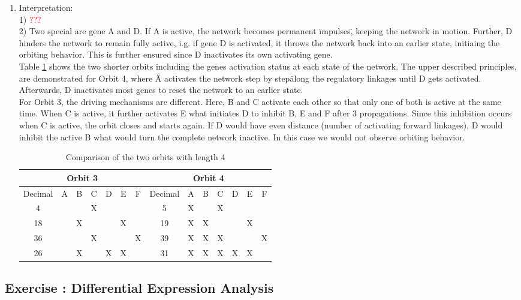 \documentclass[10pt,a4paper]{article}
\newcommand{\exercise}[1]
{
  \stepcounter{subsection}
  \subsection*{Exercise \thesubsection: #1}

}
\begin{document}
\begin{enumerate}
\item Interpretation:\\
1) \textcolor{red}{???}\\
2) Two special are gene A and D. If A is active, the network becomes permanent \"impulses\", keeping the network in motion. Further, D hinders the network to remain fully active, i.g. if gene D is activated, it throws the network back into an earlier state, initiaing the orbiting behavior. This is further ensured since D inactivates its own activating gene.\\
Table \ref{ex1_tab} shows the two shorter orbits including the genes activation status at each state of the network. The upper described principles, are demonstrated for Orbit 4, where \"A activates the network step by step\" along the regulatory linkages until D gets activated. Afterwards, D inactivates most genes to reset the network to an earlier state.\\
For Orbit 3, the driving mechanisms are different. Here, B and C activate each other so that only one of both is active at the same time. When C is active, it further activates E what initiates D to inhibit B, E and F after 3 propagations. Since this inhibition occurs when C is active, the orbit closes and starts again. If D would have even distance (number of activating forward linkages), D would inhibit the active B what would turn the complete network inactive. In this case we would not observe orbiting behavior. 
\begin{table}
	\caption{Comparison of the two orbits with length 4}
	\label{ex1_tab}
	\begin{tabular}{|c|cccccc||c|cccccc|}
	\hline
	\multicolumn{7}{|c||}{Orbit 3} & \multicolumn{7}{c|}{Orbit 4}\\
	\hline
	Decimal & A & B & C & D & E & F & Decimal & A & B & C & D & E & F\\
	\hline
	4  &   &   & X &   &   &   &  5 & X &   & X &   &   &   \\
	18 &   & X &   &   & X &   & 19 & X & X &   &   & X &   \\
	36 &   &   & X &   &   & X & 39 & X & X & X &   &   & X\\
	26 &   & X &   & X & X &   & 31 & X & X & X & X & X &   \\
	\hline
	
	\end{tabular}
\end{table}

\end{enumerate}
\exercise{Differential Expression Analysis}
\end{document}
